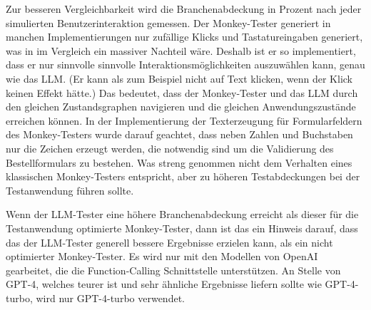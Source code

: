 Zur besseren Vergleichbarkeit wird die Branchenabdeckung in Prozent nach jeder simulierten Benutzerinteraktion gemessen.
Der Monkey-Tester generiert in manchen Implementierungen nur zufällige Klicks und Tastatureingaben generiert, was in im Vergleich ein massiver Nachteil wäre.
Deshalb ist er so implementiert, dass er nur \glqq{}sinnvolle\grqq{} sinnvolle Interaktionsmöglichkeiten auszuwählen kann, genau wie das LLM.
(Er kann als zum Beispiel nicht auf Text klicken, wenn der Klick keinen Effekt hätte.)
Das bedeutet, dass der Monkey-Tester und das LLM durch den gleichen Zustandsgraphen navigieren und die gleichen Anwendungszustände erreichen können.
In der Implementierung der Texterzeugung für Formularfeldern des Monkey-Testers wurde darauf geachtet, dass neben Zahlen und Buchstaben nur die Zeichen erzeugt werden, die notwendig sind um die Validierung des Bestellformulars zu bestehen.
Was streng genommen nicht dem Verhalten eines klassischen Monkey-Testers entspricht, aber zu höheren Testabdeckungen bei der Testanwendung führen sollte.

Wenn der LLM-Tester eine höhere Branchenabdeckung erreicht als dieser für die Testanwendung optimierte Monkey-Tester, dann ist das ein Hinweis darauf, dass das der LLM-Tester generell bessere Ergebnisse erzielen kann, als ein nicht optimierter Monkey-Tester.
Es wird nur mit den Modellen von OpenAI gearbeitet, die die Function-Calling Schnittstelle unterstützen.
An Stelle von GPT-4, welches teurer ist und sehr ähnliche Ergebnisse liefern sollte wie GPT-4-turbo, wird nur GPT-4-turbo verwendet.

